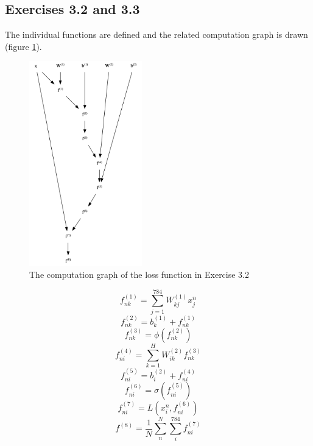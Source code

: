 \documentclass[fleqn]{article}
\begin{document}
\subsection*{Exercises 3.2 and 3.3}
The individual functions are defined and the related computation graph is drawn (figure \ref{fig:cg32}).
\begin{figure}
    \centering
    \includegraphics[height=3.5in]{cg32.png}
    \caption{The computation graph of the loss function in Exercise 3.2}
    \label{fig:cg32}
\end{figure}
\begin{equation}
    f^{(1)}_{nk} = \sum_{j=1}^{784} W^{(1)}_{kj} x^n_j
\end{equation}
\begin{equation}
    f^{(2)}_{nk} = b^{(1)}_k + f^{(1)}_{nk}
\end{equation}
\begin{equation}
    f^{(3)}_{nk} = \phi \left( f^{(2)}_{nk} \right )
\end{equation}
\begin{equation}
    f^{(4)}_{ni} = \sum_{k=1}^H W^{(2)}_{ik} f^{(3)}_{nk}
\end{equation}
\begin{equation}
    f^{(5)}_{ni} = b^{(2)}_i + f^{(4)}_{ni}
\end{equation}
\begin{equation}
    f^{(6)}_{ni} = \sigma \left ( f^{(5)}_{ni} \right )
\end{equation}
\begin{equation}
    f^{(7)}_{ni} = L\left(x_i^n, f^{(6)}_{ni}\right)
\end{equation}
\begin{equation}
    f^{(8)} = \frac{1}{N} \sum_n^N \sum_i^{784} f^{(7)}_{ni}
\end{equation}
\end{document}
